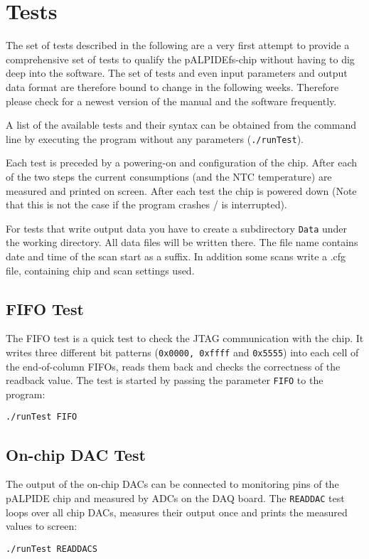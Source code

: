\documentclass{article}
\let\oldsection\section
\renewcommand\section{\clearpage\oldsection}
\begin{document}
\section{Tests}
The set of tests described in the following are a very first attempt to
provide a comprehensive set of tests to qualify the
pALPIDEfs-chip without having to dig deep into the software. The set
of tests and even input parameters and output data format are
therefore bound to change in the following weeks. Therefore please
check for a newest version of the manual and the software frequently. 

A list of the available tests and their syntax can be obtained from the
command line by executing the program without any parameters (\texttt{./runTest}).

Each test is preceded by a powering-on and configuration of the
chip. After each of the two steps the current consumptions (and the NTC
temperature) are measured and printed on screen. After each test the
chip is powered down (Note that this is not the case if the program
crashes / is interrupted).

For tests that write output data you have to create a subdirectory
\texttt{Data} under the working directory. All data files will be
written there. The file name contains date and time of the scan start
as a suffix. In addition some scans write a .cfg file, containing chip
and scan settings used.

\subsection{FIFO Test}
The FIFO test is a quick test to check the JTAG communication with the
chip. It writes three different bit patterns (\texttt{0x0000, 0xffff} and
\texttt{0x5555}) into each cell of the
end-of-column FIFOs, reads them back and checks the correctness of the
readback value. The test is started by passing the parameter
\texttt{FIFO} to the program: 
\begin{verbatim}
./runTest FIFO
\end{verbatim}

\subsection {On-chip DAC Test}
The output of the on-chip DACs can be connected to monitoring pins of
the pALPIDE chip and measured by ADCs on the DAQ board. The
\texttt{READDAC} test loops over all chip DACs, measures their
output once and prints the measured values to screen:
\begin{verbatim}
./runTest READDACS
\end{verbatim}
\end{document}
